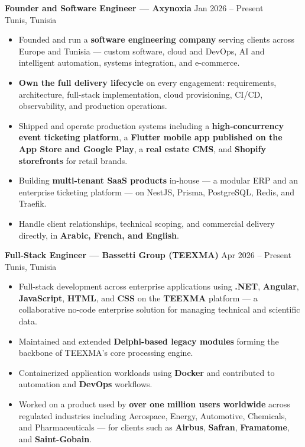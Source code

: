 \documentclass[10pt, letterpaper]{article}
\newenvironment{highlights}{
\begin{itemize}[leftmargin=12pt, itemsep=2pt]
}{
\end{itemize}
}
\begin{document}
\textbf{Founder and Software Engineer --- Axynoxia} \hfill Jan 2026 -- Present \\
Tunis, Tunisia
\begin{highlights}
\item Founded and run a \textbf{software engineering company} serving clients across Europe and Tunisia --- custom software, cloud and DevOps, AI and intelligent automation, systems integration, and e-commerce.
\item \textbf{Own the full delivery lifecycle} on every engagement: requirements, architecture, full-stack implementation, cloud provisioning, CI/CD, observability, and production operations.
\item Shipped and operate production systems including a \textbf{high-concurrency event ticketing platform}, a \textbf{Flutter mobile app published on the App Store and Google Play}, a \textbf{real estate CMS}, and \textbf{Shopify storefronts} for retail brands.
\item Building \textbf{multi-tenant SaaS products} in-house --- a modular ERP and an enterprise ticketing platform --- on NestJS, Prisma, PostgreSQL, Redis, and Traefik.
\item Handle client relationships, technical scoping, and commercial delivery directly, in \textbf{Arabic, French, and English}.
\end{highlights}

\textbf{Full-Stack Engineer --- Bassetti Group (TEEXMA)} \hfill Apr 2026 -- Present \\
Tunis, Tunisia
\begin{highlights}
\item Full-stack development across enterprise applications using \textbf{.NET}, \textbf{Angular}, \textbf{JavaScript}, \textbf{HTML}, and \textbf{CSS} on the \textbf{TEEXMA} platform --- a collaborative no-code enterprise solution for managing technical and scientific data.
\item Maintained and extended \textbf{Delphi-based legacy modules} forming the backbone of TEEXMA's core processing engine.
\item Containerized application workloads using \textbf{Docker} and contributed to automation and \textbf{DevOps} workflows.
\item Worked on a product used by \textbf{over one million users worldwide} across regulated industries including Aerospace, Energy, Automotive, Chemicals, and Pharmaceuticals --- for clients such as \textbf{Airbus}, \textbf{Safran}, \textbf{Framatome}, and \textbf{Saint-Gobain}.
\end{highlights}
\end{document}
